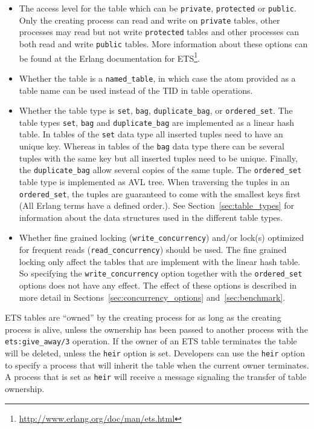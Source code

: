 \documentclass[aps,pre,preprint,nofootinbib]{revtex4}
\begin{document}
\begin{itemize}
\item
  The access level for the table which can be \verb|private|, \verb|protected| or \verb|public|.
  Only the creating process can read and write on \verb|private| tables, other processes may read but not write \verb|protected| tables and other processes can both read and write \verb|public| tables.
  More information about these options can be found at the Erlang documentation for ETS\footnote{\url{http://www.erlang.org/doc/man/ets.html}}.
\item
  Whether the table is a \verb|named_table|, in which case the atom provided as a table name can be used instead of the TID in table operations.
\item
  Whether the table type is \verb|set|, \verb|bag|, \verb|duplicate_bag|, or \verb|ordered_set|.
  The table types \verb|set|, \verb|bag| and \verb|duplicate_bag| are implemented as a linear hash table.
  In tables of the \verb|set| data type all inserted tuples need to have an unique key.
  Whereas in tables of the \verb|bag| data type there can be several tuples with the same key but all inserted tuples need to be unique.
  Finally, the \verb|duplicate_bag| allow several copies of the same tuple.
  The \verb|ordered_set| table type is implemented as AVL tree.
  When traversing the tuples in an \verb|ordered_set|, the tuples are guaranteed to come with the smallest keys first (All Erlang terms have a defined order.).
  See Section~\ref{sec:table_types} for information about the data structures used in the different table types.
\item
  Whether fine grained locking (\verb|write_concurrency|) and/or lock(s) optimized for frequent reads (\verb|read_concurrency|) should be used.
  The fine grained locking only affect the tables that are implement with the linear hash table.
  So specifying the \verb|write_concurrency| option together with the \verb|ordered_set| options does not have any effect.
  The effect of these options is described in more detail in Sections~\ref{sec:concurrency_options} and~\ref{sec:benchmark}.
\end{itemize}

ETS tables are ``owned'' by the creating process for as long as the creating process is alive, unless the ownership has been passed to another process with the \verb|ets:give_away/3| operation.
If the owner of an ETS table terminates the table will be deleted, unless the \verb|heir| option is set.
Developers can use the \verb|heir| option to specify a process that will inherit the table when the current owner terminates.
A process that is set as \verb|heir| will receive a message signaling the transfer of table ownership.
\end{document}
